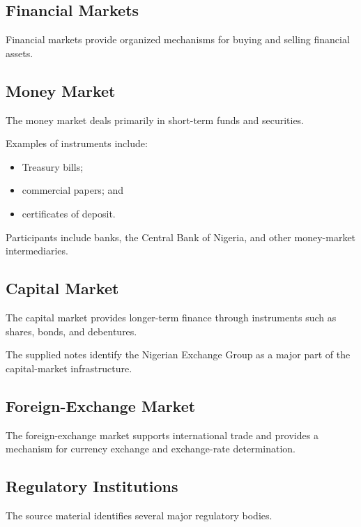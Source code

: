 \documentclass[
]{article}
\providecommand{\tightlist}{%
  \setlength{\itemsep}{0pt}\setlength{\parskip}{0pt}}
\begin{document}
\subsection{Financial Markets}\label{financial-markets}

Financial markets provide organized mechanisms for buying and selling financial assets.

\subsection{Money Market}\label{money-market}

The money market deals primarily in short-term funds and securities.

Examples of instruments include:

\begin{itemize}
\tightlist
\item
  Treasury bills;
\item
  commercial papers; and
\item
  certificates of deposit.
\end{itemize}

Participants include banks, the Central Bank of Nigeria, and other money-market intermediaries.

\subsection{Capital Market}\label{capital-market}

The capital market provides longer-term finance through instruments such as shares, bonds, and debentures.

The supplied notes identify the Nigerian Exchange Group as a major part of the capital-market infrastructure.

\subsection{Foreign-Exchange Market}\label{foreign-exchange-market}

The foreign-exchange market supports international trade and provides a mechanism for currency exchange and exchange-rate determination.

\subsection{Regulatory Institutions}\label{regulatory-institutions}

The source material identifies several major regulatory bodies.
\end{document}
